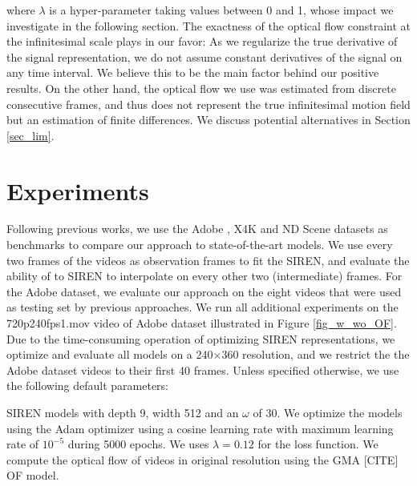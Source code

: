 \documentclass{article}
\begin{document}
where $\lambda$ is a hyper-parameter taking values between 0 and 1, whose impact we investigate in the following section.
The exactness of the optical flow constraint at the infinitesimal scale plays in our favor:
As we regularize the true derivative of the signal representation,
we do not assume constant derivatives of the signal on any time interval.
We believe this to be the main factor behind our positive results.
On the other hand, the optical flow we use was estimated from discrete consecutive frames,
and thus does not represent the true infinitesimal motion field but an estimation of finite differences.
We discuss potential alternatives in Section \ref{sec_lim}.

\section{Experiments}

Following previous works, we use the Adobe\cite{su2017deep} , X4K\cite{sim2021xvfi} and ND Scene\cite{yoon2020novel}
datasets as benchmarks to compare our approach to state-of-the-art models.
We use every two frames of the videos as observation frames to fit the SIREN,
and evaluate the ability of to SIREN to interpolate on every other two (intermediate) frames.
For the Adobe dataset, we evaluate our approach on the eight videos that were used as testing set by previous approaches.
We run all additional experiments on the 720p240fps1.mov video of Adobe dataset illustrated in Figure \ref{fig_w_wo_OF}.
Due to the time-consuming operation of optimizing SIREN representations,
we optimize and evaluate all models on a 240$\times$360 resolution,
and we restrict the the Adobe dataset videos to their first 40 frames.
Unless specified otherwise, we use the following default parameters:

SIREN models with depth 9, width 512 and an $\omega$ of 30.
We optimize the models using the Adam optimizer using a cosine learning rate with maximum learning rate of $10^{-5}$ during 5000 epochs.
We uses $\lambda = 0.12$ for the loss function. We compute the optical flow of videos in original resolution using the GMA [CITE] OF model.
\end{document}
